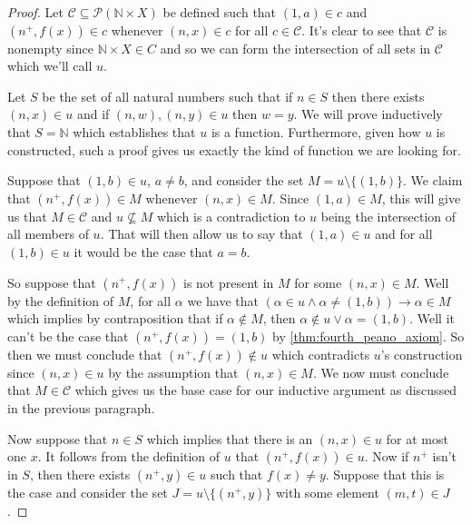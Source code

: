\documentclass{article}
\theoremstyle{definition}
\theoremstyle{definition}
\theoremstyle{plain}
\theoremstyle{remark}
\theoremstyle{plain}
\theoremstyle{remark}
\theoremstyle{plain}
\theoremstyle{plain}
\theoremstyle{plain}
\theoremstyle{plain}
\begin{document}
\begin{proof}
Let \( \mathcal{C} \subseteq \mathcal{P} (\mathbb{N} \times X )\) be defined 
such that \( (1, a) \in c \) and \( (n^{+}, f(x)) \in c \) whenever 
\( ( n, x ) \in c \) for all \( c \in \mathcal{C} \). It's clear to see that 
\( \mathcal{C} \) is nonempty since \( \mathbb{N} \times X \in C \) and so we 
can form the intersection of all sets in \( \mathcal{C} \) which we'll call 
\( u \). 

Let \( S \) be the set of all natural numbers such that if 
\( n \in S \) then there exists \( (n, x) \in u \) and if 
\( (n, w), (n,y) \in u\) then \( w = y \). We will prove inductively that 
\( S = \mathbb{N} \) which establishes that \( u \) is a function. Furthermore, 
given how \( u \) is constructed, such a proof gives us exactly the kind of 
function we are looking for. 

Suppose that \( (1, b) \in u \), \( a \neq b\), and consider the set 
\( M = u \setminus \{ (1,b) \} \).  We claim that \( (n^{+}, f(x)) \in M \) 
whenever \( ( n, x ) \in M \). Since \( (1, a) \in M \), this will give us that 
\( M \in \mathcal{C} \) and 
\( u \not\subseteq M \) which is a contradiction to \( u \) being the 
intersection of all members of \( u \). That will then allow us to say that 
\( (1,a) \in u \) and for all \( (1,b) \in u \) it would be the case that 
\( a = b \). 

So suppose that \( (n^{+}, f(x)) \) is not present in \( M \) for some 
\( (n,x) \in M \). Well by the definition of \( M \), for all \( \alpha \) 
we have that 
\( (\alpha \in u \land \alpha \neq (1,b)) \rightarrow \alpha \in M \) which 
implies by contraposition that if \( \alpha \not\in M \), then 
\( \alpha \not\in u \lor \alpha = (1, b) \). Well  it can't be the case that 
\( (n^{+},f(x)) = (1,b) \) by \autoref{thm:fourth_peano_axiom}. So then we must 
conclude that \( (n^{+}, f(x)) \not\in u \) which 
contradicts \( u \)'s construction since \( (n,x) \in u \) by the 
assumption that \( (n,x) \in M \). We now must conclude that  
\( M \in \mathcal{C} \) which gives us the base case for our inductive argument
as discussed in the previous paragraph.

Now suppose that \( n \in S \) which implies that there is an \( (n,x) \in u \) 
for at most one \( x \). It follows from the definition of \( u \) that 
\( (n^{+}, f(x)) \in u \). Now if \( n^{+} \) isn't in \( S \), then there 
exists \( (n^{+}, y) \in u \) such that \( f(x) \neq y \). Suppose that this 
is the case and consider the set 
\( J = u \setminus \{(n^{+},y)\} \) with some element \( (m, t) \in J \). 


\end{proof}
\end{document}
